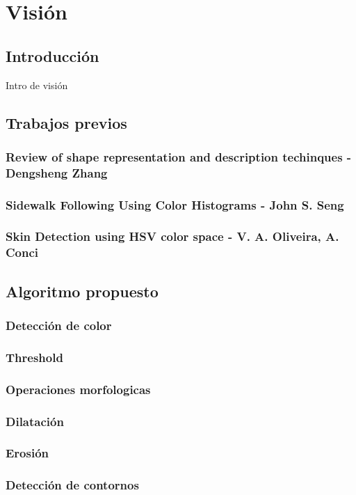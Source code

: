 \section{Visi\'on}

\subsection{Introducci\'on}
Intro de visi\'on

\subsection{Trabajos previos}
	\subsubsection{Review of shape representation and description techinques - Dengsheng Zhang}
	\subsubsection{Sidewalk Following Using Color Histograms - John S. Seng}
	\subsubsection{Skin Detection using HSV color space - V. A. Oliveira, A. Conci}
	
\subsection{Algoritmo propuesto}
	\subsubsection{Detecci\'on de color}
	\subsubsection{Threshold}
	\subsubsection{Operaciones morfologicas}
		\subsubsection*{Dilataci\'on}
		\subsubsection*{Erosi\'on}
	\subsubsection{Detecci\'on de contornos}
